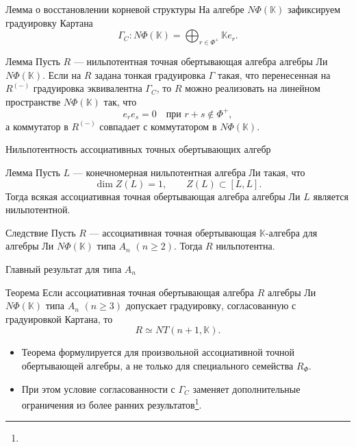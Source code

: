 \documentclass[12pt,aspectratio=169]{beamer}
\newcommand{\K}{\mathbb{K}}
\newcommand{\sourcefootnote}[1]{\footnote{\slidecite{#1}}}
\begin{document}
\begin{frame}[t]{Лемма о восстановлении корневой структуры}
    На алгебре $N\Phi(\mathbb{K})$ зафиксируем градуировку Картана
    \[
        \Gamma_C\colon N\Phi(\mathbb{K})=
        \bigoplus_{r\in\Phi^+}\mathbb{K}e_r.
    \]
    \begin{block}{Лемма}
        Пусть $R$ --- нильпотентная точная обертывающая алгебра алгебры Ли $N\Phi(\K)$. Если на $R$ задана тонкая градуировка $\Gamma$ такая, что перенесенная на $R^{(-)}$ градуировка эквивалентна $\Gamma_C$, то $R$ можно реализовать на линейном пространстве $N\Phi(\K)$ так, что
        \[
            e_r e_s=0\quad \text{при } r+s\notin\Phi^+,
        \]
        а коммутатор в $R^{(-)}$ совпадает с коммутатором в $N\Phi(\K)$.
    \end{block}
\end{frame}

\begin{frame}[t]{Нильпотентность ассоциативных точных обертывающих алгебр}
    \begin{block}{Лемма}
        Пусть $L$ --- конечномерная нильпотентная алгебра Ли такая, что
        \[
            \dim Z(L)=1,\qquad Z(L)\subset [L,L].
        \]
        Тогда всякая ассоциативная точная обертывающая алгебра алгебры Ли $L$ является
        нильпотентной.
    \end{block}

    \begin{block}{Следствие}
        Пусть $R$ --- ассоциативная точная обертывающая $\K$-алгебра для алгебры Ли $N\Phi(\K)$ типа $A_n$ $(n\ge 2)$. Тогда $R$ нильпотентна.
    \end{block}
\end{frame}

\begin{frame}[t]{Главный результат для типа $A_n$}
    \begin{alertblock}{Теорема}
        Если ассоциативная точная обертывающая алгебра $R$ алгебры Ли $N\Phi(\K)$ типа $A_n$ $(n\ge 3)$ допускает градуировку, согласованную с градуировкой Картана, то
        \[
            R \simeq NT(n+1,\K).
        \]
    \end{alertblock}

    \begin{itemize}
        \item Теорема формулируется для произвольной ассоциативной точной обертывающей
              алгебры, а не только для специального семейства $R_\Phi$.
        \item При этом условие согласованности с $\Gamma_C$ заменяет дополнительные
              ограничения из более ранних результатов\sourcefootnote{imm2020,smj2023}.
    \end{itemize}
\end{frame}
\end{document}
